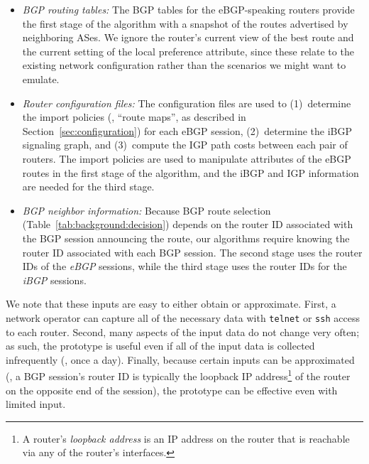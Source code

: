 \begin{itemize}
\item {\em BGP routing tables:}
The BGP tables for the eBGP-speaking routers provide the first stage of the
algorithm with a snapshot of the routes advertised by neighboring
ASes.  We ignore the router's current view of the best route and the
current setting of the local preference attribute, since these relate
to the existing network configuration rather than the scenarios we
might want to emulate.

\item {\em Router configuration files:} The configuration files are used
to (1)~determine the import policies (\ie, ``route maps'', as described
in Section~\ref{sec:configuration}) for each eBGP
session, (2)~determine the iBGP signaling graph, and (3)~compute the IGP
path costs between each pair of routers.  The import policies are used
to manipulate attributes of the eBGP routes in the first stage of the
algorithm, and the iBGP and IGP information are needed for the third
stage.

\item {\em BGP neighbor information:}
Because BGP route selection (Table~\ref{tab:background:decision})
depends on the router ID associated 
with the BGP session announcing the route, our algorithms require
knowing the router ID associated with each BGP session.  The second
stage uses the router IDs of the {\em eBGP\/} sessions, while the
third stage uses the router IDs for the {\em iBGP\/} sessions.
\end{itemize}
\noindent
We note that these inputs are easy to either obtain or approximate.
First, a
network operator can capture all of the necessary data with {\tt telnet} or
{\tt ssh} access to each router.  Second, many aspects of the input data do
not change very often; as such, the prototype is useful even if all of
the input data is collected infrequently (\eg, once a day).  Finally,
because certain inputs can be approximated (\eg, a BGP session's router
ID is typically the loopback IP address\footnote{A router's {\em loopback
address} is an IP address on the router that is reachable via any of
the router's interfaces.}
of the router on the opposite
end of the session), the prototype can be effective even with limited
input.



